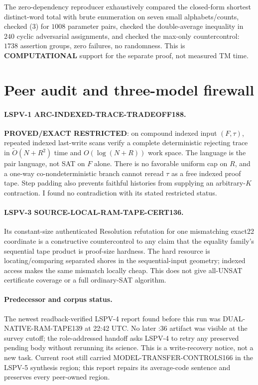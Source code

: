 \documentclass[11pt]{article}
\begin{document}
The zero-dependency reproducer exhaustively compared the closed-form shortest distinct-word total with brute enumeration on seven small alphabets/counts, checked (3) for $1008$ parameter pairs, checked the double-average inequality in $240$ cyclic adversarial assignments, and checked the max-only countercontrol: $1738$ assertion groups, zero failures, no randomness.  This is \textbf{COMPUTATIONAL} support for the separate proof, not measured TM time.

\section{Peer audit and three-model firewall}
\paragraph{LSPV-1 ARC-INDEXED-TRACE-TRADEOFF188.}
\textbf{PROVED/EXACT RESTRICTED}: on compound indexed input $(F,\tau)$, repeated indexed last-write scans verify a complete deterministic rejecting trace in $\widetilde O(N+R^2)$ time and $O(\log(N+R))$ work space.  The language is the pair language, not SAT on $F$ alone.  There is no favorable uniform cap on $R$, and a one-way co-nondeterministic branch cannot reread $\tau$ as a free indexed proof tape.  Step padding also prevents faithful histories from supplying an arbitrary-$K$ contraction.  I found no contradiction with its stated restricted status.

\paragraph{LSPV-3 SOURCE-LOCAL-RAM-TAPE-CERT136.}
Its constant-size authenticated Resolution refutation for one mismatching exact22 coordinate is a constructive countercontrol to any claim that the equality family's sequential tape product is proof-size hardness.  The hard resource is locating/comparing separated shores in the sequential-input geometry; indexed access makes the same mismatch locally cheap.  This does not give all-UNSAT certificate coverage or a full ordinary-SAT algorithm.

\paragraph{Predecessor and corpus status.}
The newest readback-verified LSPV-4 report found before this run was DUAL-NATIVE-RAM-TAPE139 at 22:42 UTC.  No later :36 artifact was visible at the survey cutoff; the role-addressed handoff asks LSPV-4 to retry any preserved pending body without rerunning its science.  This is a write-recovery notice, not a new task.  Current root still carried MODEL-TRANSFER-CONTROLS166 in the LSPV-5 synthesis region; this report repairs its average-code sentence and preserves every peer-owned region.
\end{document}
